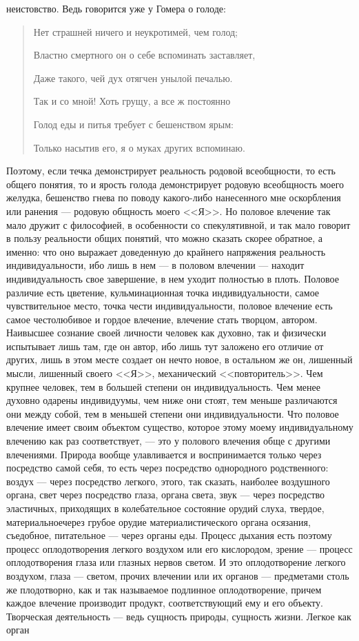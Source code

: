 \documentclass[12pt]{article}
\begin{document}
неистовство. Ведь говорится уже у Гомера о голоде: 

\begin{quote}
    
Нет страшней ничего и неукротимей, чем голод; 

Властно смертного он о себе вспоминать заставляет, 

Даже такого, чей дух отягчен унылой печалью. 

Так и со мной! Хоть грущу, а все ж постоянно 

Голод еды и питья требует с бешенством ярым: 

Только насытив его, я о муках других вспоминаю. 

\end{quote}

Поэтому, если течка демонстрирует реальность родовой всеобщности, то есть общего понятия, то и ярость голода демонстрирует родовую всеобщность моего желудка, бешенство гнева по поводу какого-либо нанесенного мне оскорбления или ранения --- родовую общность моего <<Я>>. Но половое влечение так мало дружит с философией, в особенности со спекулятивной, и так мало говорит в пользу реальности общих понятий, что можно сказать скорее обратное, а именно: что оно выражает доведенную до крайнего напряжения реальность индивидуальности, ибо лишь в нем --- в половом влечении --- находит индивидуальность свое завершение, в нем уходит полностью в плоть. Половое различие есть цветение, кульминационная точка индивидуальности, самое чувствительное место, точка чести индивидуальности, половое влечение есть самое честолюбивое и гордое влечение, влечение стать творцом, автором. Наивысшее сознание своей личности человек как духовно, так и физически испытывает лишь там, где он автор, ибо лишь тут заложено его отличие от других, лишь в этом месте создает он нечто новое, в остальном же он, лишенный мысли, лишенный своего <<Я>>, механический <<повторитель>>. Чем крупнее человек, тем в большей степени он индивидуальность. Чем менее духовно одарены индивидуумы, чем ниже они стоят, тем меньше различаются они между собой, тем в меньшей степени они индивидуальности. Что половое влечение имеет своим объектом существо, которое этому моему индивидуальному влечению как раз соответствует, --- это у полового влечения обще с другими влечениями. Природа вообще улавливается и воспринимается только через посредство самой себя, то есть через посредство однородного родственного: воздух --- через посредство легкого, этого, так сказать, наиболее воздушного органа, свет через посредство глаза, органа света, звук --- через посредство эластичных, приходящих в колебательное состояние орудий слуха, твердое, материальноечерез грубое орудие материалистического органа осязания, съедобное, питательное --- через органы еды. Процесс дыхания есть поэтому процесс оплодотворения легкого воздухом или его кислородом, зрение --- процесс оплодотворения глаза или глазных нервов светом. И это оплодотворение легкого воздухом, глаза --- светом, прочих влечении или их органов --- предметами столь же плодотворно, как и так называемое подлинное оплодотворение, причем каждое влечение производит продукт, соответствующий ему и его объекту. Творческая деятельность --- ведь сущность природы, сущность жизни. Легкое как орган 
\end{document}
